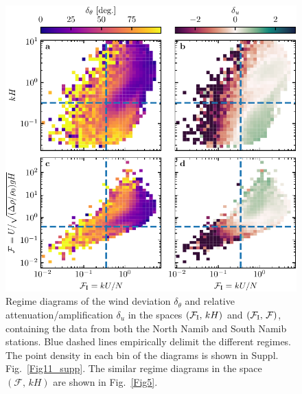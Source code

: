 \begin{figure}[p]
\centering
\includegraphics[scale=1]{Figures/Figure13_supp.pdf}
\caption{Regime diagrams of the wind deviation $\delta_{\theta}$ and relative attenuation/amplification $\delta_{u}$ in the spaces $(\mathcal{F}_{\textup{I}}, \, kH)$ and $(\mathcal{F}_{\textup{I}}, \, \mathcal{F})$, containing the data from both the North Namib and South Namib stations. Blue dashed lines empirically delimit the different regimes. The point density in each bin of the diagrams is shown in Suppl. Fig.~\ref{Fig11_supp}. The similar regime diagrams in the space $(\mathcal{F}, \, kH)$ are shown in Fig.~\ref{Fig5}.}
\label{Fig13_supp}
\end{figure}

